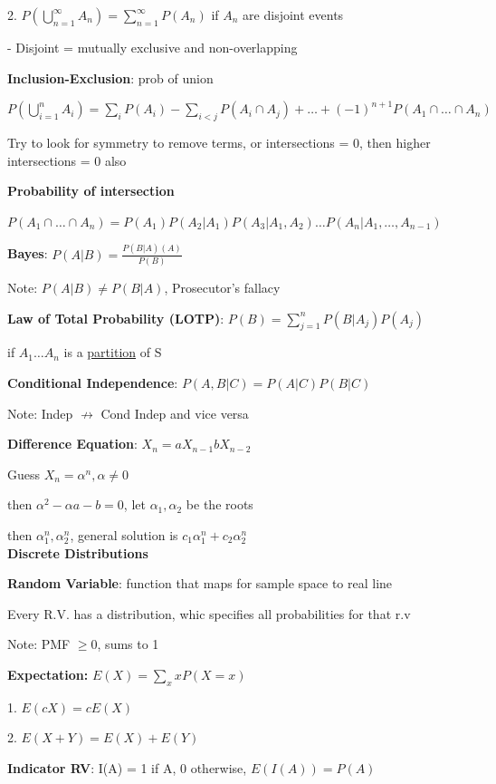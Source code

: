 \documentclass[10pt, a4paper]{article}
\newcommand{\red}[1]{{\color{red}#1}}
\newcommand{\header}[1]{{\normalsize\textbf{#1}}}
\newcommand{\tab}[0]{\hspace*{2mm}}
\begin{document}
\begin{multicols*}{3}
		2. $P(\bigcup_{n = 1}^{\infty} A_n) = \sum_{n = 1}^{\infty} P(A_n)$ if $A_n$ are disjoint events
		
		\tab{} - Disjoint = mutually exclusive and non-overlapping

		\textbf{Inclusion-Exclusion}: prob of union

		$P(\bigcup_{i = 1}^{n} A_i) = \sum_{i} P(A_i) - \sum_{i < j} P(A_i \cap A_j) + \dots + (-1)^{n + 1}P(A_1 \cap \dots \cap A_n)$
	
		Try to look for symmetry to remove terms, or intersections = 0, then higher intersections = 0 also

		\textbf{Probability of intersection}

		$P(A_1 \cap \dots \cap A_n) = P(A_1)P(A_2 | A_1)P(A_3|A_1, A_2)\dots P(A_n | A_1, \dots , A_{n - 1})$

		\textbf{Bayes}: $P(A | B) = \frac{P(B|A)(A)}{P(B)}$

		\red{Note}: $P(A|B) \neq P(B|A)$, Prosecutor's fallacy

		\textbf{Law of Total Probability (LOTP)}: $P(B) = \sum_{j = 1}^{n} P(B|A_j)P(A_j)$

		if $A_1 \dots A_n$ is a \underline{partition} of S

		\textbf{Conditional Independence}: $P(A, B|C) = P(A|C)P(B|C)$

		\red{Note}: Indep $ \not\rightarrow$ Cond Indep and vice versa

		\textbf{Difference Equation}: $X_n = a X_{n-1} b X_{n-2}$

		Guess $X_n = \alpha^n, \alpha \neq 0$

		then $\alpha^2 - \alpha a - b = 0$, let $\alpha_1, \alpha_2$ be the roots

		then $\alpha_1^n, \alpha_2^n$, general solution is $c_1 \alpha_1^n + c_2 \alpha_2^n$\\

		\header{Discrete Distributions}
		
		\textbf{Random Variable}: function that maps for sample space to real line

		Every R.V. has a distribution, whic specifies all probabilities for that r.v

		\red{Note}: PMF $\geq 0$, sums to 1

		\textbf{Expectation:} $E(X) = \sum_{x} xP(X=x)$

		1. $E(cX) = cE(X)$

		2. $E(X + Y) = E(X) + E(Y)$

		\textbf{Indicator RV}: I(A) = 1 if A, 0 otherwise, $E(I(A)) = P(A)$


\end{multicols*}
\end{document}
